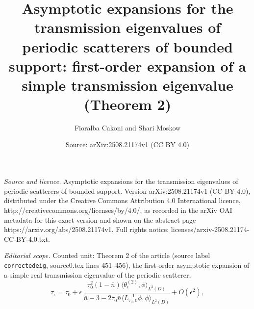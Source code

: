 \documentclass[10pt,a4paper]{amsart}
\title[Asymptotic expansions for the transmission eigenvalues of periodic scatterers of bounded support]{Asymptotic expansions for the transmission eigenvalues of periodic scatterers of bounded support: first-order expansion of a simple transmission eigenvalue (Theorem 2)}
\author{Fioralba Cakoni and Shari Moskow}
\date{Source: arXiv:2508.21174v1 (CC BY 4.0)}
\begin{document}
\maketitle
\noindent\emph{Source and licence.} Asymptotic expansions for the transmission eigenvalues of periodic scatterers of bounded support. Version arXiv:2508.21174v1 (CC BY 4.0), distributed under the Creative Commons Attribution 4.0 International licence, http://creativecommons.org/licenses/by/4.0/, as recorded in the arXiv OAI metadata for this exact version and shown on the abstract page https://arxiv.org/abs/2508.21174v1. Full rights notice: licenses/arxiv-2508.21174-CC-BY-4.0.txt.\par\smallskip
\noindent\textit{Editorial scope.} Counted unit: Theorem 2 of the article (source label \texttt{correctedeig}, source0.tex lines 451--456), the first-order asymptotic expansion of a simple real transmission eigenvalue of the periodic scatterer,
\[\tau_\epsilon=\tau_0+\epsilon\,\frac{\tau_0^2(1-\bar n)\langle\theta_\epsilon^{(2)},\phi\rangle_{L^2(D)}}{\bar n-3-2\tau_0\bar n\langle L^{-1}_{\tau_0,0}\phi,\phi\rangle_{L^2(D)}}+O(\epsilon^2),\]
\end{document}
